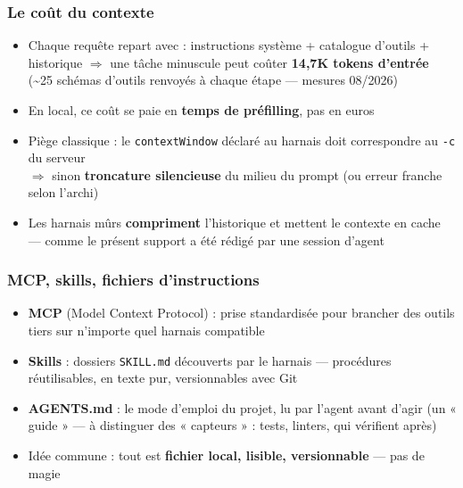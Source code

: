 \documentclass[
	11pt,
	aspectratio=169
]{beamer}
\begin{document}
\begin{frame}
    \frametitle{Le coût du contexte}
    \begin{itemize}\setlength\itemsep{0.5em}
        \item Chaque requête repart avec : instructions système + catalogue d'outils + historique $\Rightarrow$ une tâche minuscule peut coûter \textbf{14{,}7K tokens d'entrée} (\textasciitilde25 schémas d'outils renvoyés à chaque étape --- mesures 08/2026)
        \item En local, ce coût se paie en \textbf{temps de préfilling}, pas en euros
        \item Piège classique : le \texttt{contextWindow} déclaré au harnais doit correspondre au \texttt{-c} du serveur \\ $\Rightarrow$ sinon \textbf{troncature silencieuse} du milieu du prompt (ou erreur franche selon l'archi)
        \item Les harnais mûrs \textbf{compriment} l'historique et mettent le contexte en cache --- comme le présent support a été rédigé par une session d'agent
    \end{itemize}
\end{frame}

\begin{frame}
    \frametitle{MCP, skills, fichiers d'instructions}
    \begin{itemize}\setlength\itemsep{0.5em}
        \item \textbf{MCP} (Model Context Protocol) : prise standardisée pour brancher des outils tiers sur n'importe quel harnais compatible
        \item \textbf{Skills} : dossiers \texttt{SKILL.md} découverts par le harnais --- procédures réutilisables, en texte pur, versionnables avec Git
        \item \textbf{AGENTS.md} : le mode d'emploi du projet, lu par l'agent avant d'agir (un « guide » --- à distinguer des « capteurs » : tests, linters, qui vérifient après)
        \item Idée commune : tout est \textbf{fichier local, lisible, versionnable} --- pas de magie
    \end{itemize}
\end{frame}
\end{document}
